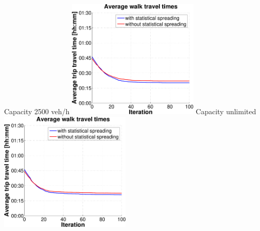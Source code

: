 {  \createsubfigure%
  {Capacity 2500 veh/h}%
  {\includegraphics[width=0.47\textwidth, angle=0, trim=0mm 0mm 0mm 9mm, clip=true]{extending/figures/MultiModalSimulation/simulations/avg_walk_traveltime_scatter_2500}}%
  {\label{}}%
  {\hspace{3mm}}%
  \createsubfigure%
  {Capacity unlimited}%
  {\includegraphics[width=0.47\textwidth, angle=0, trim=0mm 0mm 0mm 9mm, clip=true]{extending/figures/MultiModalSimulation/simulations/avg_walk_traveltime_scatter_unlimited}}%
  {\label{}}%
  {}%
}%
{}

